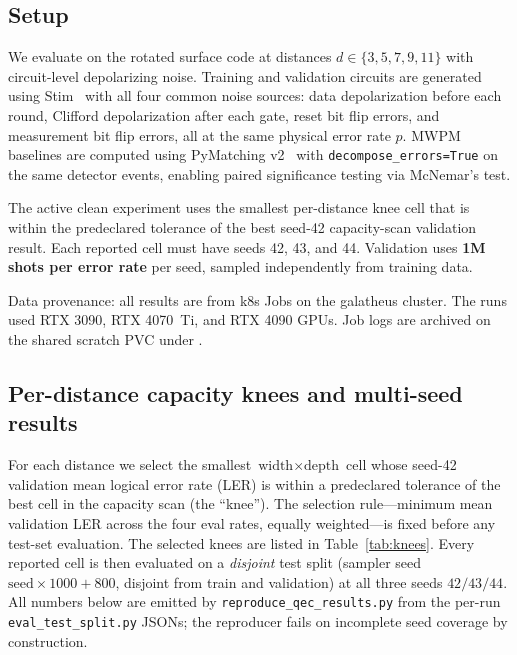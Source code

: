 \documentclass[11pt,a4paper]{article}
\begin{document}
\subsection{Setup}

We evaluate on the rotated surface code at distances
$d \in \{3, 5, 7, 9, 11\}$ with circuit-level depolarizing noise.
Training and validation circuits are generated using
Stim~\cite{gidney2021stim} with all four common noise sources: data
depolarization before each round, Clifford depolarization after each
gate, reset bit flip errors, and measurement bit flip errors, all at the
same physical error rate $p$. MWPM baselines are computed using
PyMatching v2~\cite{higgott2022pymatching,higgott2025sparse} with
\texttt{decompose\_errors=True} on the same detector events, enabling
paired significance testing via McNemar's test.

The active clean experiment uses the smallest per-distance knee cell that
is within the predeclared tolerance of the best seed-42 capacity-scan
validation result. Each reported cell must have seeds 42, 43, and 44.
Validation uses \textbf{1M shots per error rate} per seed, sampled
independently from training data.

Data provenance: all results are from k8s Jobs on the galatheus cluster.
The runs used RTX 3090, RTX 4070~Ti, and RTX 4090 GPUs. Job logs are
archived on the shared scratch PVC under .

\subsection{Per-distance capacity knees and multi-seed results}
\label{sec:results}

For each distance we select the smallest $\textrm{width}\times\textrm{depth}$
cell whose seed-42 validation mean logical error rate (LER) is within a
predeclared tolerance of the best cell in the capacity scan (the
``knee''). The selection rule---minimum mean validation LER across the four
eval rates, equally weighted---is fixed before any test-set evaluation. The
selected knees are listed in Table~\ref{tab:knees}. Every reported cell is
then evaluated on a \emph{disjoint} test split (sampler seed
$\textrm{seed}\times1000+800$, disjoint from train and validation) at all
three seeds $42/43/44$. All numbers below are emitted by
\texttt{reproduce\_qec\_results.py} from the per-run
\texttt{eval\_test\_split.py} JSONs; the reproducer fails on incomplete
seed coverage by construction.
\end{document}

